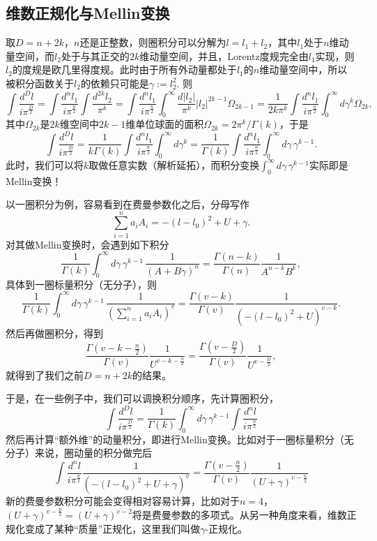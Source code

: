 \documentclass[11pt]{article}
\theoremstyle{definition}
\theoremstyle{plain}
\begin{document}
\subsection{维数正规化与Mellin变换}

取$D=n+2k$，$n$还是正整数，则圈积分可以分解为$l=l_1+l_2$，其中$l_1$处于$n$维动量空间，而$l_2$处于与其正交的$2k$维动量空间，并且，Lorentz度规完全由$l_1$实现，则$l_2$的度规是欧几里得度规。此时由于所有外动量都处于$l_1$的$n$维动量空间中，所以被积分函数关于$l_2$的依赖只可能是$\gamma:=l_2^2$. 则
\[
	\int \frac{d^{D} l}{i \pi^{\frac{D}{2}}}=\int \frac{d^{n} l_1}{i \pi^{\frac{n}{2}}}\int \frac{d^{2k} l_2}{\pi^{k}}=\int \frac{d^{n} l_1}{i \pi^{\frac{n}{2}}}\int_0^\infty \frac{d |l_2|}{\pi^{k}} |l_2|^{2k-1} \Omega_{2k-1}=\frac{1}{2k \pi^k}\int \frac{d^{n} l_1}{i \pi^{\frac{n}{2}}}\int_0^\infty d\gamma^k \Omega_{2k},
\]
其中$\Omega_{2k}$是$2k$维空间中$2k-1$维单位球面的面积$\Omega_{2k}=2\pi^k/\Gamma(k)$，于是
\[
	\int \frac{d^{D} l}{i \pi^{\frac{D}{2}}}=\frac{1}{k\Gamma(k)}\int \frac{d^{n} l_1}{i \pi^{\frac{n}{2}}}\int_0^\infty d\gamma^k=\frac{1}{\Gamma(k)}\int \frac{d^{n} l_1}{i \pi^{\frac{n}{2}}}\int_0^\infty d\gamma\, \gamma^{k-1}.
\]
此时，我们可以将$k$取做任意实数（解析延拓），而积分变换$\int_0^\infty d\gamma\, \gamma^{k-1}$实际即是Mellin变换！

以一圈积分为例，容易看到在费曼参数化之后，分母写作
\[
	\sum_{i=1}^n a_iA_i= -(l-l_0)^2+U+\gamma.
\]
对其做Mellin变换时，会遇到如下积分
\[
	\frac{1}{\Gamma(k)}\int_0^\infty d\gamma \, \gamma^{k-1}\, \frac{1}{(A+B\gamma)^n}=\frac{\Gamma(n-k)}{\Gamma(n)}\frac{1}{A^{n-k}B^k},
\]
具体到一圈标量积分（无分子），则
\[
	\frac{1}{\Gamma(k)}\int_0^\infty d\gamma \, \gamma^{k-1}\, \frac{1}{(\sum_{i=1}^n a_iA_i)^v}=\frac{\Gamma(v-k)}{\Gamma(v)}\frac{1}{(-(l-l_0)^2+U)^{v-k}}.
\]
然后再做圈积分，得到
\[
	\frac{\Gamma\left(v-k-\frac{n}{2}\right)}{\Gamma(v)}\frac{1}{U^{v-k-\frac{n}{2}}}=\frac{\Gamma\left(v-\frac{D}{2}\right)}{\Gamma(v)} \frac{1}{U^{v-\frac{D}{2}}},
\]
就得到了我们之前$D=n+2k$的结果。

于是，在一些例子中，我们可以调换积分顺序，先计算圈积分，
\[
	\int \frac{d^{D} l}{i \pi^{\frac{D}{2}}}=\frac{1}{\Gamma(k)}\int_0^\infty d\gamma\, \gamma^{k-1}\int \frac{d^{n} l}{i \pi^{\frac{n}{2}}}
\]
然后再计算“额外维”的动量积分，即进行Mellin变换。比如对于一圈标量积分（无分子）来说，圈动量的积分做完后
\[
	\int \frac{d^{n} l}{i \pi^{\frac{n}{2}}} \frac{1}{(-(l-l_0)^2+U+\gamma)^v}
	=\frac{\Gamma\left(v-\frac{n}{2}\right)}{\Gamma(v)} \frac{1}{(U+\gamma)^{v-\frac{n}{2}}}
\]
新的费曼参数积分可能会变得相对容易计算，比如对于$n=4$，$(U+\gamma)^{v-\frac{n}{2}}=(U+\gamma)^{v-2}$将是费曼参数的多项式。从另一种角度来看，维数正规化变成了某种“质量”正规化，这里我们叫做$\gamma$-正规化。
\end{document}
